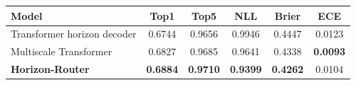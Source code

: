 \begin{tabular}{lccccc}
\toprule
Model & Top1 & Top5 & NLL & Brier & ECE \\
\midrule
Transformer horizon decoder & 0.6744 & 0.9656 & 0.9946 & 0.4447 & 0.0123 \\
Multiscale Transformer & 0.6827 & 0.9685 & 0.9641 & 0.4338 & \textbf{0.0093} \\
\textbf{Horizon-Router} & \textbf{0.6884} & \textbf{0.9710} & \textbf{0.9399} & \textbf{0.4262} & 0.0104 \\
\bottomrule
\end{tabular}
